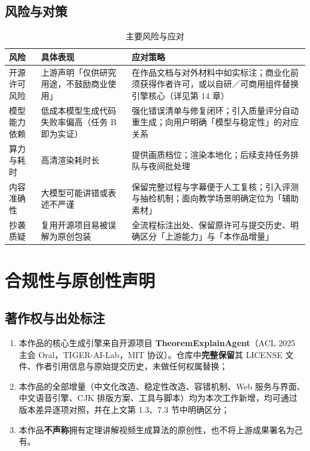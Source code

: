 \documentclass[11pt,a4paper]{ctexart}
\begin{document}
\subsection{风险与对策}

\begin{table}[htbp]
\centering
\small
\caption{主要风险与应对}
\begin{tabularx}{\textwidth}{@{}p{2.6cm} p{4.6cm} X@{}}
\toprule
\textbf{风险} & \textbf{具体表现} & \textbf{应对策略} \\
\midrule
开源许可风险 & 上游声明「仅供研究用途，不鼓励商业使用」 & 在作品文档与对外材料中如实标注；商业化前须获得作者许可，或以自研／可商用组件替换引擎核心（详见第 14 章） \\
模型能力依赖 & 低成本模型生成代码失败率偏高（任务 B 即为实证） & 强化错误清单与修复闭环；引入质量评分自动重生成；向用户明确「模型与稳定性」的对应关系 \\
算力与耗时 & 高清渲染耗时长 & 提供画质档位；渲染本地化；后续支持任务排队与夜间批处理 \\
内容准确性 & 大模型可能讲错或表述不严谨 & 保留完整过程与字幕便于人工复核；引入评测与抽检机制；面向教学场景明确定位为「辅助素材」 \\
抄袭质疑 & 复用开源项目易被误解为原创包装 & 全流程标注出处、保留原许可与提交历史、明确区分「上游能力」与「本作品增量」 \\
\bottomrule
\end{tabularx}
\end{table}

\section{合规性与原创性声明}

\subsection{著作权与出处标注}

\begin{enumerate}
  \item 本作品的核心生成引擎来自开源项目 \textbf{TheoremExplainAgent}（ACL 2025 主会 Oral，TIGER-AI-Lab，MIT 协议）。仓库中\textbf{完整保留}其 LICENSE 文件、作者引用信息与原始提交历史，未做任何权属替换；
  \item 本作品的全部增量（中文化改造、稳定性改造、容错机制、Web 服务与界面、中文语音引擎、CJK 排版方案、工具与脚本）均为本次工作新增，均可通过版本差异逐项对照，并在上文第 1.3、7.3 节中明确区分；
  \item 本作品\textbf{不声称}拥有定理讲解视频生成算法的原创性，也不将上游成果署名为己有。
\end{enumerate}
\end{document}
